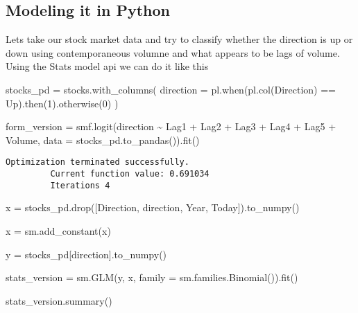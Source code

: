 \documentclass[
  letterpaper,
  DIV=11,
  numbers=noendperiod]{scrreprt}
\newenvironment{Shaded}{\begin{snugshade}}{\end{snugshade}}
\newcommand{\DecValTok}[1]{\textcolor[rgb]{0.68,0.00,0.00}{#1}}
\newcommand{\NormalTok}[1]{\textcolor[rgb]{0.00,0.23,0.31}{#1}}
\newcommand{\OperatorTok}[1]{\textcolor[rgb]{0.37,0.37,0.37}{#1}}
\newcommand{\StringTok}[1]{\textcolor[rgb]{0.13,0.47,0.30}{#1}}
\begin{document}
\subsection{Modeling it in Python}\label{modeling-it-in-python}

Lets take our stock market data and try to classify whether the
direction is up or down using contemporaneous volumne and what appears
to be lags of volume. Using the Stats model api we can do it like this

\begin{Shaded}
\begin{Highlighting}[]
\NormalTok{stocks\_pd }\OperatorTok{=}\NormalTok{ stocks.with\_columns(}
\NormalTok{    direction }\OperatorTok{=}\NormalTok{ pl.when(pl.col(}\StringTok{\textquotesingle{}Direction\textquotesingle{}}\NormalTok{) }\OperatorTok{==} \StringTok{\textquotesingle{}Up\textquotesingle{}}\NormalTok{).then(}\DecValTok{1}\NormalTok{).otherwise(}\DecValTok{0}\NormalTok{)}
\NormalTok{)}

\NormalTok{form\_version }\OperatorTok{=}\NormalTok{ smf.logit(}\StringTok{\textquotesingle{}direction \textasciitilde{} Lag1 + Lag2 + Lag3 + Lag4 + Lag5 + Volume\textquotesingle{}}\NormalTok{, data }\OperatorTok{=}\NormalTok{ stocks\_pd.to\_pandas()).fit()}
\end{Highlighting}
\end{Shaded}

\begin{verbatim}
Optimization terminated successfully.
         Current function value: 0.691034
         Iterations 4
\end{verbatim}

\begin{Shaded}
\begin{Highlighting}[]
\NormalTok{x }\OperatorTok{=}\NormalTok{ stocks\_pd.drop([}\StringTok{\textquotesingle{}Direction\textquotesingle{}}\NormalTok{, }\StringTok{\textquotesingle{}direction\textquotesingle{}}\NormalTok{, }\StringTok{\textquotesingle{}Year\textquotesingle{}}\NormalTok{, }\StringTok{\textquotesingle{}Today\textquotesingle{}}\NormalTok{]).to\_numpy()}

\NormalTok{x }\OperatorTok{=}\NormalTok{ sm.add\_constant(x)}

\NormalTok{y }\OperatorTok{=}\NormalTok{ stocks\_pd[}\StringTok{\textquotesingle{}direction\textquotesingle{}}\NormalTok{].to\_numpy()}

\NormalTok{stats\_version }\OperatorTok{=}\NormalTok{ sm.GLM(y, x, family }\OperatorTok{=}\NormalTok{ sm.families.Binomial()).fit()}

\NormalTok{stats\_version.summary()}
\end{Highlighting}
\end{Shaded}
\end{document}
